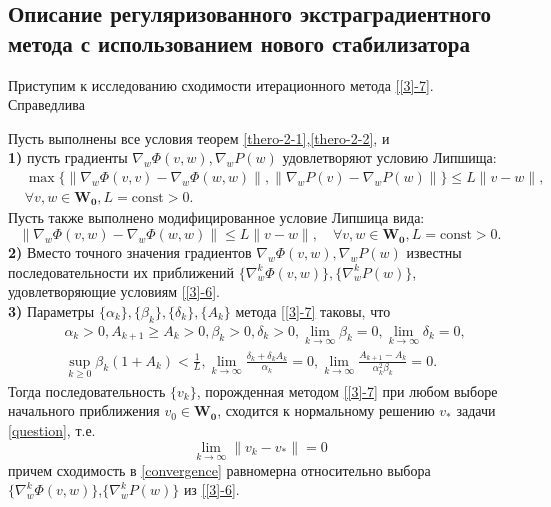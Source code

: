 \subsection{Описание регуляризованного экстраградиентного метода с использованием нового стабилизатора}
\noindent Приступим к исследованию сходимости итерационного метода \eqref{[3]-7}. Справедлива
\begin{theo}
	\label{thero-2-3}
	Пусть выполнены все условия теорем \ref{thero-2-1},\ref{thero-2-2}, и \\
	\textbf{1)} пусть градиенты $\nabla_w\Phi(v,w),\nabla_wP(w)$ удовлетворяют условию Липшища:
	\begin{equation}
	\label{[3]-29}
	\begin{aligned}
	&\max\{ \|\nabla_w\Phi(v,v)-\nabla_w\Phi(w,w)\|,\|\nabla_wP(v)-\nabla_wP(w)\|\}\leqslant L\|v-w\|,\\
	&\forall v,w\in\mathbf{W_0},L=\mathrm{const}>0.
	\end{aligned}
	\end{equation}
	Пусть также выполнено модифицированное условие Липшица вида:
	\begin{equation}
	\label{[3]-29-2}
	\|\nabla_w\Phi(v,w)-\nabla_w\Phi(w,w)\|\leqslant L\|v-w\|,\quad \forall v,w\in\mathbf{W_0},L=\mathrm{const}>0.
	\end{equation}
	\textbf{2)} Вместо точного значения градиентов $\nabla_w\Phi(v,w),\nabla_wP(w)$ известны последовательности их приближений $\{\nabla_w^k\Phi(v,w)\},\{\nabla_w^kP(w) \}$, удовлетворяющие условиям \eqref{[3]-6}.\\
	\textbf{3)} Параметры $\{\alpha_k\},\{\beta_k\},\{\delta_k\},\{A_k\}$ метода \eqref{[3]-7} таковы, что \\
	\begin{equation}
	\label{[3]-30}
	\begin{aligned}
	&\alpha_k >0,A_{k+1}\geqslant A_k>0,\beta_k>0,\delta_k>0,\lim_{k\to \infty}\beta_k=0,\lim_{k\to\infty}\delta_k=0,\\
	&\sup_{k\geqslant 0}\beta_k(1+A_k)<\frac{1}{L},\lim_{k\to\infty}\frac{\delta_k+\delta_kA_k}{\alpha_k}=0,\lim_{k\to \infty}\frac{A_{k+1}-A_k}{\alpha_k^2\beta_k}=0.
	\end{aligned}
	\end{equation}
	Тогда последовательность $\{v_k\}$, порожденная методом \eqref{[3]-7} при любом выборе начального приближения $v_0\in \mathbf{W_0}$, сходится к нормальному решению $v_*$ задачи \eqref{question}, т.е.
	\begin{equation}
	\label{convergence}
	\lim_{k\to \infty}\|v_k-v_*\|=0
	\end{equation}
	причем сходимость в \eqref{convergence} равномерна относительно выбора $\{\nabla_w^k\Phi(v,w)\}$,$\{\nabla_w^kP(w) \}$ из \eqref{[3]-6}.
\end{theo}
